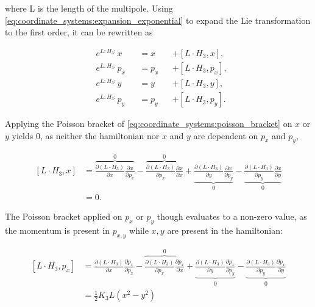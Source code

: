 where L is the length of the multipole. 
Using \cref{eq:coordinate_systems:expansion_exponential} to expand the Lie transformation to the
first order, it can be rewritten as

\begin{equation}
    \begin{alignedat}{3}
        &e^{L:H_3:} x   &&= x   &&+ [L \cdot H_3, x], \\
        &e^{L:H_3:} p_x &&= p_x &&+ [L \cdot H_3, p_x], \\
        &e^{L:H_3:} y   &&= y   &&+ [L \cdot H_3, y], \\
        &e^{L:H_3:} p_y &&= p_y &&+ [L \cdot H_3, p_y].
        \label{eq:coordinate_systems:lie_exponential_first_order_sextupole}
    \end{alignedat}
\end{equation}

Applying the Poisson bracket of \cref{eq:coordinate_systems:poisson_bracket} on $x$ or $y$ yields
$0$, as neither the hamiltonian nor $x$ and $y$ are dependent on $p_x$ and $p_y$,

\begin{equation}
  \begin{aligned}
    [L \cdot H_3, x] &= 
       \overbrace{\frac{\partial (L \cdot H_3)}{\partial x} \frac{\partial x}{\partial p_x}}^{0}
       - \overbrace{\frac{\partial (L \cdot H_3)}{\partial p_x} \frac{\partial x}{\partial x}}^{0}
       + \underbrace{\frac{\partial (L \cdot H_3)}{\partial y} \frac{\partial x}{\partial p_y}}_0
       - \underbrace{\frac{\partial (L \cdot H_3)}{\partial p_y} \frac{\partial x}{\partial y}}_0 \\
                    &= 0.
  \end{aligned}
  \label{eq:coordinate_systems:sextupole_transfer_x_poisson}
\end{equation}


The Poisson bracket applied on $p_x$ or $p_y$ though evaluates to a non-zero value, as the momentum
is present in $p_{x, y}$ while $x, y$ are present in the hamiltonian:

\begin{equation}
  \begin{aligned}
    [L \cdot H_3, p_x] &=
       \frac{\partial (L \cdot H_3)}{\partial x} \frac{\partial p_x}{\partial p_x}
     - \overbrace{\frac{\partial (L \cdot H_3)}{\partial p_x} \frac{\partial p_x}{\partial x}}^{0}
     + \underbrace{\frac{\partial (L \cdot H_3)}{\partial y} \frac{\partial p_x}{\partial p_y}}_0
     - \underbrace{\frac{\partial (L \cdot H_3)}{\partial p_y} \frac{\partial p_x}{\partial y}}_0 \\
                        & = \frac{1}{2} K_3 L (x^2 - y^2)
  \end{aligned}
  \label{eq:coordinate_systems:sextupole_transfer_px_poisson}
\end{equation}


